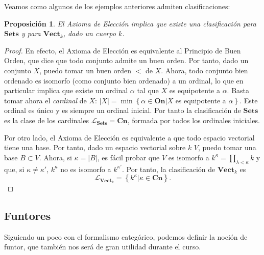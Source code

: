 \documentclass[12pt,a4paper]{book}
\newtheorem{prop}[thm]{Proposición}
\theoremstyle{definition} \newtheorem{defn}[thm]{Definición}
\theoremstyle{definition} \newtheorem{ejemplo}[thm]{Ejemplo}
\theoremstyle{definition} \newtheorem{ejercicio}[thm]{Ejercicio}
\theoremstyle{remark} \newtheorem*{obs}{Observación}
\begin{document}
Veamos como algunos de los ejemplos anteriores admiten clasificaciones:
\begin{prop}
  El Axioma de Elección implica que existe una clasificación para $\mathbf{Sets}$ y para $\mathbf{Vect}_k$, dado un cuerpo $k$.
\end{prop}
\begin{proof}
  En efecto, el Axioma de Elección es equivalente al Principio de Buen Orden, que dice que todo conjunto admite un buen orden. Por tanto, dado un conjunto $X$, puedo tomar un buen orden $<$ de $X$. Ahora, todo conjunto bien ordenado es isomorfo (como conjunto bien ordenado) a un ordinal, lo que en particular implica que existe un ordinal $\alpha$ tal que $X$ es equipotente a $\alpha$. Basta tomar ahora el \emph{cardinal} de $X$: $|X|=\min\left\{ \alpha \in \mathbf{On} | X\right.$ es equipotente a $\left. \alpha \right\}$. Este ordinal es único y es siempre un ordinal inicial. Por tanto la clasificación de $\mathbf{Sets}$ es la clase de los cardinales $\mathcal{L}_{\mathbf{Sets}}=\mathbf{Cn}$, formada por todos los ordinales iniciales. 

  Por otro lado, el Axioma de Elección es equivalente a que todo espacio vectorial tiene una base. Por tanto, dado un espacio vectorial sobre $k$ $V$, puedo tomar una base $B\subset V$. Ahora, si $\kappa=|B|$, es fácil probar que $V$ es isomorfo a $k^{\kappa}=\prod_{\lambda < \kappa} k$ y que, si $\kappa \neq \kappa'$, $k^{\kappa}$ no es isomorfo a $k^{\kappa'}$. Por tanto, la clasificación de $\mathbf{Vect}_k$ es 
  \begin{equation*}
    \mathcal{L}_{\mathbf{Vect}_k}=\left\lbrace k^{\kappa} | \kappa \in \mathbf{Cn} \right\rbrace.
  \end{equation*}
\end{proof}

\subsection{Funtores}

Siguiendo un poco con el formalismo categórico, podemos definir la noción de funtor, que también nos será de gran utilidad durante el curso.
\end{document}
